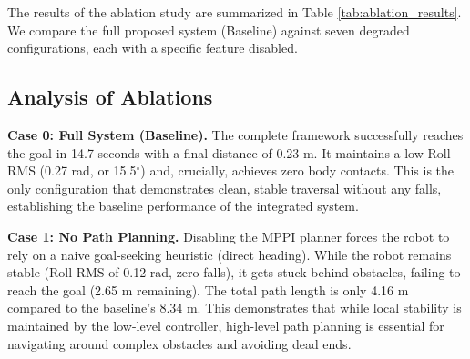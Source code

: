 \documentclass[letterpaper, 10 pt, conference]{ieeeconf}  %
\begin{document}
The results of the ablation study are summarized in Table \ref{tab:ablation_results}. We compare the full proposed system (Baseline) against seven degraded configurations, each with a specific feature disabled.

\begin{table}[!t]
\centering
\caption{Ablation Study Results: 5m Traversal over Uneven Terrain}
\label{tab:ablation_results}
\end{table}

\subsection{Analysis of Ablations}

\textbf{Case 0: Full System (Baseline).} The complete framework successfully reaches the goal in 14.7 seconds with a final distance of 0.23 m. It maintains a low Roll RMS (0.27 rad, or 15.5$^\circ$) and, crucially, achieves zero body contacts. This is the only configuration that demonstrates clean, stable traversal without any falls, establishing the baseline performance of the integrated system.

\textbf{Case 1: No Path Planning.} Disabling the MPPI planner forces the robot to rely on a naive goal-seeking heuristic (direct heading). While the robot remains stable (Roll RMS of 0.12 rad, zero falls), it gets stuck behind obstacles, failing to reach the goal (2.65 m remaining). The total path length is only 4.16 m compared to the baseline's 8.34 m. This demonstrates that while local stability is maintained by the low-level controller, high-level path planning is essential for navigating around complex obstacles and avoiding dead ends.
\end{document}

